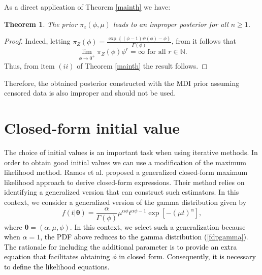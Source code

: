 \documentclass[]{interact}
\newcommand{\bs}{\boldsymbol}
\theoremstyle{plain}%
\newtheorem{theorem}{Theorem}[section]
\theoremstyle{definition}
\theoremstyle{remark}
\begin{document}
As a direct application of Theorem \ref{mainth} we have:
\begin{theorem} The prior $\pi_z(\phi,\mu)$ leads to an improper posterior for all $n\geq 1$.
\end{theorem}
\begin{proof} Indeed,  letting $\pi_Z(\phi) = \frac{\exp\left\{(\phi-1)\psi(\phi)-\phi\right\}}{\Gamma(\phi)}$, from \cite{ramos2021posterior} it follows that 
\begin{equation*} \lim_{\phi\to 0^+}\pi_Z(\phi)\phi^r = \infty\mbox{ for all }r\in \mathbb{N}.
\end{equation*}
Thus, from item $(ii)$ of Theorem \ref{mainth} the result follows.
\end{proof}
Therefore, the obtained posterior constructed with the MDI prior assuming censored data is also improper and should not be used.



\section{Closed-form initial value}

The choice of initial values is an important task when using iterative methods. In order to obtain good initial values we can use a modification of the maximum likelihood method. Ramos et al. \cite{ramos2023asymptotic} proposed a generalized closed-form maximum likelihood approach to derive closed-form expressions. Their method relies on identifying a generalized version that can construct such estimators. In this context, we consider a generalized version of the gamma distribution given by
\begin{equation*} f(t| \bs{\theta}) = \frac{\alpha}{\Gamma(\phi)} \mu^{\alpha \phi}t^{\alpha\phi-1}\exp\left[-(\mu t)^\alpha\right],
\end{equation*}
where $\bs{\theta}=(\alpha,\mu,\phi)$. \textcolor{black}{In this context, we select such a generalization because when $\alpha=1$, the PDF above reduces to the gamma distribution (\ref{fdpgamma}). The rationale for including the additional parameter is to provide an extra equation that facilitates obtaining $\phi$ in closed form. Consequently, it is necessary to define the likelihood equations.}
\end{document}
